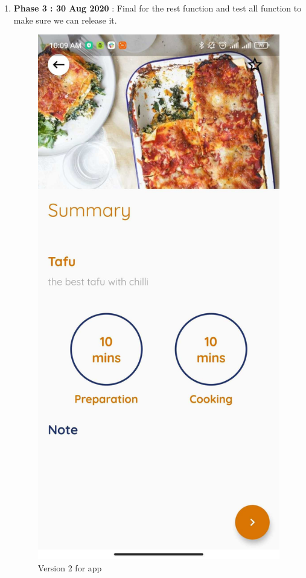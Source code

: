 \documentclass{article}
\begin{document}
\begin{enumerate}
        \item \textbf{Phase 3 : 30 Aug 2020} : Final for the rest function and test all function to make sure we can release it. \\
        \begin{figure}[h!]
        \centering
        \includegraphics[scale=0.1]{Images/Homepage_data.jpg}
        \caption{Version 2 for app}
        \label{fig:cookingbook}
        \end{figure}
        

\end{enumerate}
\end{document}

